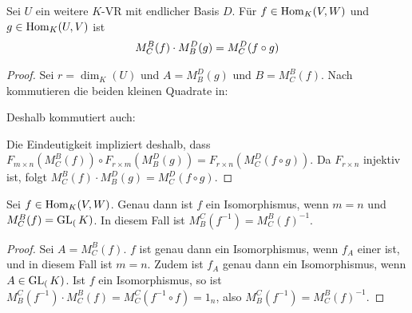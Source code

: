 \begin{lemma}
	Sei $U$ ein weitere $K$-VR mit endlicher Basis $D$. Für $f\in \operatorname{Hom}_K(V,W)$ und $g\in \operatorname{Hom}_K(U,V)$ ist 
	\begin{align}
		M_C^B(f)\cdot M_B^D(g)=M_C^D(f\circ g)\notag
	\end{align}
\end{lemma}
\begin{proof}
	Sei $r=\dim_K(U)$ und $A=M_B^D(g)$ und $B=M_C^B(f)$. Nach  kommutieren die beiden kleinen Quadrate in: 
	\begin{center}\end{center}
	Deshalb kommutiert auch:
	\begin{center}\end{center}
	Die Eindeutigkeit impliziert deshalb, dass $F_{m\times n}(M_C^B(f))\circ F_{r\times m}(M_B^D(g))=F_{r\times n}
	(M_C^D(f\circ g))$. Da $F_{r\times n}$ injektiv ist, folgt $M_C^B(f)\cdot M_B^D(g)=M_C^D(f\circ g)$.
\end{proof}

\begin{conclusion}
	Sei $f\in \operatorname{Hom}_K(V,W)$. Genau dann ist $f$ ein Isomorphismus, wenn $m=n$ und $M_C^B(f)=\operatorname{GL}_(K)$. In 
	diesem Fall ist $M_B^C(f^{-1})=M_C^B(f)^{-1}$.
\end{conclusion}
\begin{proof}
	Sei $A=M_C^B(f)$. $f$ ist genau dann ein Isomorphismus, wenn $f_A$ einer ist, und in diesem Fall ist $m=n$. Zudem ist 
	$f_A$ genau dann ein Isomorphismus, wenn $A\in \operatorname{GL}_(K)$. Ist $f$ ein Isomorphismus, so ist $M_B^C(f^{-1})\cdot 
	M_C^B(f)=M_C^C(f^{-1}\circ f)=1_n$, also $M_B^C(f^{-1})=M_C^B(f)^{-1}$.
\end{proof}

